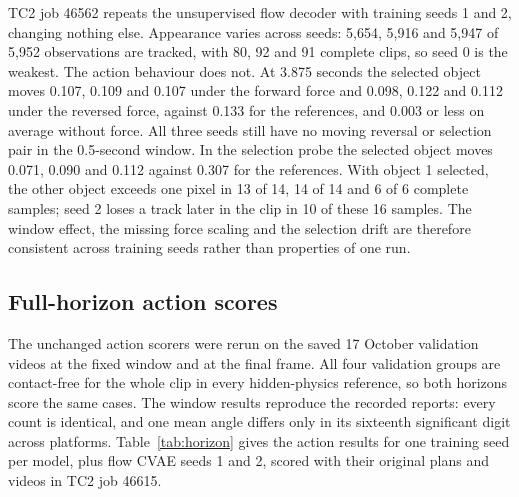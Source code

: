 \documentclass[11pt,a4paper]{article}
\begin{document}
TC2 job 46562 repeats the unsupervised flow decoder with training seeds 1 and 2, changing nothing else. Appearance varies across seeds: 5,654, 5,916 and 5,947 of 5,952 observations are tracked, with 80, 92 and 91 complete clips, so seed 0 is the weakest. The action behaviour does not. At 3.875 seconds the selected object moves 0.107, 0.109 and 0.107 under the forward force and 0.098, 0.122 and 0.112 under the reversed force, against 0.133 for the references, and 0.003 or less on average without force. All three seeds still have no moving reversal or selection pair in the 0.5-second window. In the selection probe the selected object moves 0.071, 0.090 and 0.112 against 0.307 for the references. With object 1 selected, the other object exceeds one pixel in 13 of 14, 14 of 14 and 6 of 6 complete samples; seed 2 loses a track later in the clip in 10 of these 16 samples. The window effect, the missing force scaling and the selection drift are therefore consistent across training seeds rather than properties of one run.

\subsection{Full-horizon action scores}
\label{sec:horizon}
The unchanged action scorers were rerun on the saved 17 October validation videos at the fixed window and at the final frame. All four validation groups are contact-free for the whole clip in every hidden-physics reference, so both horizons score the same cases. The window results reproduce the recorded reports: every count is identical, and one mean angle differs only in its sixteenth significant digit across platforms. Table~\ref{tab:horizon} gives the action results for one training seed per model, plus flow CVAE seeds 1 and 2, scored with their original plans and videos in TC2 job 46615.
\end{document}
